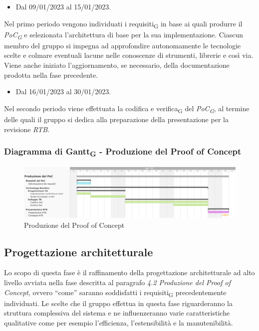\:
\begin{itemize}
    \item Dal 09/01/2023 al 15/01/2023.
\end{itemize}
Nel primo periodo vengono individuati i requisiti\textsubscript{G} in base ai quali produrre il \textit{PoC\textsubscript{G}} e selezionata l’architettura di base per la sua implementazione. Ciascun membro del gruppo si impegna ad approfondire autonomamente le tecnologie scelte e colmare eventuali lacune nelle conoscenze di strumenti, librerie e così via. Viene anche iniziato l'aggiornamento, se necessario, della documentazione prodotta nella fase precedente.

\:
\begin{itemize}
    \item Dal 16/01/2023 al 30/01/2023.
\end{itemize}
Nel secondo periodo viene effettuata la codifica e verifica\textsubscript{G} del \textit{PoC\textsubscript{G}}, al termine delle quali il gruppo si dedica alla preparazione della presentazione per la revisione \textit{RTB}.

\subsubsection{Diagramma di Gantt\textsubscript{G} - Produzione del Proof of Concept}

\begin{figure}[H]
\centering
\includegraphics[width=\textwidth]{img/4_produzione.png}
\caption{Produzione del Proof of Concept}
\end{figure}

\subsection{Progettazione architetturale}
Lo scopo di questa fase è il raffinamento della progettazione architetturale ad alto livello avviata nella fase descritta al paragrafo \textit{4.2 Produzione del Proof of Concept}, ovvero “come” saranno soddisfatti i requisiti\textsubscript{G} precedentemente individuati.
Le scelte che il gruppo effettua in questa fase riguarderanno la struttura complessiva del sistema e ne influenzeranno varie caratteristiche qualitative come per esempio l’efficienza, l’estensibilità e la manutenibilità.


